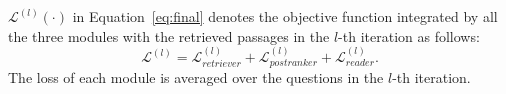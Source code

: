 $\mathcal{L}^{(l)}(\cdot)$ in Equation~\ref{eq:final} denotes the objective function integrated by all the three modules with the retrieved passages in the $l$-th iteration as follows:
\begin{equation}
    \mathcal{L}^{(l)} = \mathcal{L}^{(l)}_{retriever} + \mathcal{L}^{(l)}_{postranker}+ \mathcal{L}^{(l)}_{reader}.
\end{equation}
The loss of each module is averaged over the questions in the $l$-th iteration.
 



